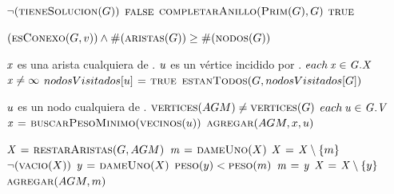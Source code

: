 \begin{codebox}
\li \If $\neg (\textnormal{\scshape tieneSolucion}(G))$
\li     \Then
            \Return $\textnormal{\scshape false}$
        \End
\li $\textnormal{\scshape completarAnillo}(\textnormal{\scshape Prim}(G),G)$
\li \Return $\textnormal{\scshape true}$
\end{codebox}


\vspace*{0.3cm}


\begin{codebox}
\li \Return $(\textnormal{\scshape esConexo}(G,v)) \land
    \textnormal{\scshape\#}(\textnormal{\scshape aristas}(G)) \geq
    \textnormal{\scshape\#}(\textnormal{\scshape nodos}(G))$
\end{codebox}


\vspace*{0.3cm}


\begin{codebox}
\li \Comment $\id{x}$ es una arista cualquiera de .
\li \Comment $\id{u}$ es un vértice incidido por .
\li \For $each \hspace{0.07cm} \id{x} \in \id{G.X}$
\li     \Do
            \If $\id{x} \neq \infty$
\li             \Then
                    $nodosVisitados[u] \mathrel{\hspace{1pt}=\hspace{1pt}} \textnormal{\scshape true}$
                \End
        \End
\li \Return $\textnormal{\scshape estanTodos}(G,nodosVisitados[G])$
\end{codebox}


\vspace*{0.3cm}


\begin{codebox}
\li \Comment $\id{u}$ es un nodo cualquiera de .
\li \While $\textnormal{\scshape vertices}(AGM) \neq \textnormal{\scshape vertices}(G)$
\li     \Do
            \For $each \hspace{0.07cm} \id{u} \in \id{G.V}$
\li             \Do
                    $\id{x} \gets \proc{buscarPesoMinimo}(\proc{vecinos}(u))$
\li                 $\textnormal{\scshape agregar}(AGM,x,u)$
                \End
        \End
\end{codebox}


\vspace*{0.3cm}


\begin{codebox}
\li $\id{X} \gets \proc{restarAristas}(G,AGM)$
\li $\id{m} \gets \proc{dameUno}(X)$
\li $\id{X} \gets \id{X} \setminus \{m\}$
\li \While $\neg (\textnormal{\scshape vacio}(X))$
\li     \Do
            $\id{y} \gets \proc{dameUno}(X)$
\li         \If $\textnormal{\scshape peso}(y) < \textnormal{\scshape peso}(m)$
\li             \Then
                    $\id{m} \gets \id{y}$
                \End
\li         $\id{X} \gets \id{X} \setminus \{y\}$
        \End
\li \Return $\textnormal{\scshape agregar}(AGM, m)$
\end{codebox}


